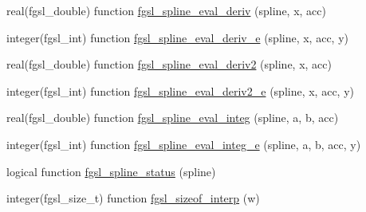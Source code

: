 \begin{DoxyCompactItemize}
\item 
real(fgsl\-\_\-double) function \hyperlink{interp_8finc_ad35a0ca7d65c7ad70cc808689390b9c6}{fgsl\-\_\-spline\-\_\-eval\-\_\-deriv} (spline, x, acc)
\item 
integer(fgsl\-\_\-int) function \hyperlink{interp_8finc_a0ccfb4a4c766da212d6308f80ae9d7b6}{fgsl\-\_\-spline\-\_\-eval\-\_\-deriv\-\_\-e} (spline, x, acc, y)
\item 
real(fgsl\-\_\-double) function \hyperlink{interp_8finc_a134500bed3f7e814dab384a7a9187799}{fgsl\-\_\-spline\-\_\-eval\-\_\-deriv2} (spline, x, acc)
\item 
integer(fgsl\-\_\-int) function \hyperlink{interp_8finc_ad9d2570e13c828bbb27ef3a4c16a896d}{fgsl\-\_\-spline\-\_\-eval\-\_\-deriv2\-\_\-e} (spline, x, acc, y)
\item 
real(fgsl\-\_\-double) function \hyperlink{interp_8finc_a760faf66a424126d3818e61ad7fb20ac}{fgsl\-\_\-spline\-\_\-eval\-\_\-integ} (spline, a, b, acc)
\item 
integer(fgsl\-\_\-int) function \hyperlink{interp_8finc_a369bc13e2713a7b1924249d79af2ec7f}{fgsl\-\_\-spline\-\_\-eval\-\_\-integ\-\_\-e} (spline, a, b, acc, y)
\item 
logical function \hyperlink{interp_8finc_aa23ee1340710742e108a1681c9ee4ef7}{fgsl\-\_\-spline\-\_\-status} (spline)
\item 
integer(fgsl\-\_\-size\-\_\-t) function \hyperlink{interp_8finc_a7acb5abbb8c6382196dcaae035764b85}{fgsl\-\_\-sizeof\-\_\-interp} (w)
\end{DoxyCompactItemize}


